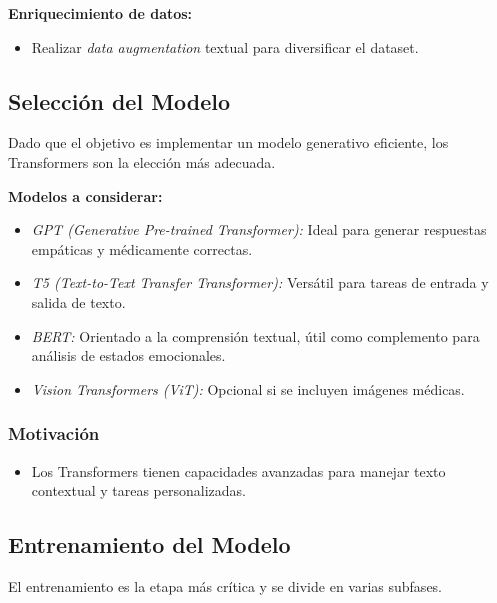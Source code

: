 \textbf{Enriquecimiento de datos:}
\begin{itemize}
    \item Realizar \textit{data augmentation} textual para diversificar el dataset.
\end{itemize}


\subsection{Selección del Modelo}
Dado que el objetivo es implementar un modelo generativo eficiente, los Transformers son la elección más adecuada.

\textbf{Modelos a considerar:}
\begin{itemize}
    \item \textit{GPT (Generative Pre-trained Transformer):} Ideal para generar respuestas empáticas y médicamente correctas.
    \item \textit{T5 (Text-to-Text Transfer Transformer):} Versátil para tareas de entrada y salida de texto.
    \item \textit{BERT:} Orientado a la comprensión textual, útil como complemento para análisis de estados emocionales.
    \item \textit{Vision Transformers (ViT):} Opcional si se incluyen imágenes médicas.
\end{itemize}


\subsubsection{Motivación}
\begin{itemize}
    \item Los Transformers tienen capacidades avanzadas para manejar texto contextual y tareas personalizadas.
\end{itemize}

\subsection{Entrenamiento del Modelo}
El entrenamiento es la etapa más crítica y se divide en varias subfases.

